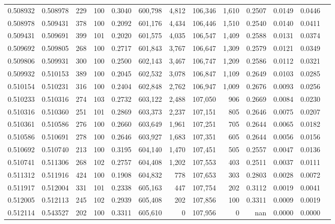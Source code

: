 \begin{tabular}{rrrrrrrrrrrrr}
0.508932 & 0.508978 &   229 & 100 &                                     0.3040 & 600,798 &   4,812 & 106,346 &   1,610 & 0.2507 & 0.0149 & 0.0446 \\
0.508978 & 0.509431 &   378 & 100 &                                     0.2092 & 601,176 &   4,434 & 106,446 &   1,510 & 0.2540 & 0.0140 & 0.0411 \\
0.509431 & 0.509691 &   399 & 101 &                                     0.2020 & 601,575 &   4,035 & 106,547 &   1,409 & 0.2588 & 0.0131 & 0.0374 \\
0.509692 & 0.509805 &   268 & 100 &                                     0.2717 & 601,843 &   3,767 & 106,647 &   1,309 & 0.2579 & 0.0121 & 0.0349 \\
0.509806 & 0.509931 &   300 & 100 &                                     0.2500 & 602,143 &   3,467 & 106,747 &   1,209 & 0.2586 & 0.0112 & 0.0321 \\
0.509932 & 0.510153 &   389 & 100 &                                     0.2045 & 602,532 &   3,078 & 106,847 &   1,109 & 0.2649 & 0.0103 & 0.0285 \\
0.510154 & 0.510231 &   316 & 100 &                                     0.2404 & 602,848 &   2,762 & 106,947 &   1,009 & 0.2676 & 0.0093 & 0.0256 \\
0.510233 & 0.510316 &   274 & 103 &                                     0.2732 & 603,122 &   2,488 & 107,050 &     906 & 0.2669 & 0.0084 & 0.0230 \\
0.510316 & 0.510360 &   251 & 101 &                                     0.2869 & 603,373 &   2,237 & 107,151 &     805 & 0.2646 & 0.0075 & 0.0207 \\
0.510361 & 0.510586 &   276 & 100 &                                     0.2660 & 603,649 &   1,961 & 107,251 &     705 & 0.2644 & 0.0065 & 0.0182 \\
0.510586 & 0.510691 &   278 & 100 &                                     0.2646 & 603,927 &   1,683 & 107,351 &     605 & 0.2644 & 0.0056 & 0.0156 \\
0.510692 & 0.510740 &   213 & 100 &                                     0.3195 & 604,140 &   1,470 & 107,451 &     505 & 0.2557 & 0.0047 & 0.0136 \\
0.510741 & 0.511306 &   268 & 102 &                                     0.2757 & 604,408 &   1,202 & 107,553 &     403 & 0.2511 & 0.0037 & 0.0111 \\
0.511312 & 0.511916 &   424 & 100 &                                     0.1908 & 604,832 &     778 & 107,653 &     303 & 0.2803 & 0.0028 & 0.0072 \\
0.511917 & 0.512004 &   331 & 101 &                                     0.2338 & 605,163 &     447 & 107,754 &     202 & 0.3112 & 0.0019 & 0.0041 \\
0.512005 & 0.512113 &   245 & 102 &                                     0.2939 & 605,408 &     202 & 107,856 &     100 & 0.3311 & 0.0009 & 0.0019 \\
0.512114 & 0.543527 &   202 & 100 &                                     0.3311 & 605,610 &       0 & 107,956 &       0 &    nan & 0.0000 & 0.0000 \\
\bottomrule
\end{tabular}
